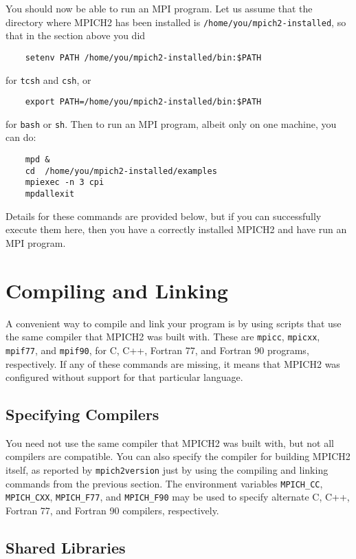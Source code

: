 \documentclass[dvipdfm,11pt]{article}
\begin{document}
You should now be able to run an MPI program.  Let us assume that the
directory where MPICH2 has been installed is
\texttt{/home/you/mpich2-installed}, so that in the section above you
did
\begin{verbatim}
    setenv PATH /home/you/mpich2-installed/bin:$PATH
\end{verbatim}
for \texttt{tcsh} and \texttt{csh}, or 
\begin{verbatim}
    export PATH=/home/you/mpich2-installed/bin:$PATH
\end{verbatim}
for \texttt{bash} or \texttt{sh}.
Then to run an MPI program, albeit only on one machine, you can do:
\begin{verbatim}
    mpd &
    cd  /home/you/mpich2-installed/examples
    mpiexec -n 3 cpi
    mpdallexit
\end{verbatim}
Details for these commands are provided below, but if you can
successfully execute them here, then you have a correctly installed
MPICH2 and have run an MPI program. 

\section{Compiling and Linking}
\label{sec:compiling}

A convenient way to compile and link your program is by using scripts
that use the same compiler that MPICH2 was built with.  These are
\texttt{mpicc}, \texttt{mpicxx}, \texttt{mpif77}, and \texttt{mpif90},
for C, C++, Fortran 77, and Fortran 90 programs, respectively.  If any
of these commands are missing, it means that MPICH2 was configured
without support for that particular language.

\subsection{Specifying Compilers}
\label{sec:specifying-compilers}

You need not use the same compiler that MPICH2 was built with, but not
all compilers are compatible.  You can also specify the compiler for
building MPICH2 itself, as reported by \texttt{mpich2version} just by
using the compiling and linking commands from the previous section.
The environment variables \texttt{MPICH\_CC}, \texttt{MPICH\_CXX},
\texttt{MPICH\_F77}, and \texttt{MPICH\_F90} may be used to specify
alternate C, C++, Fortran 77, and Fortran 90 compilers, respectively.

\subsection{Shared Libraries}
\label{sec:shared-libraries}
\end{document}
